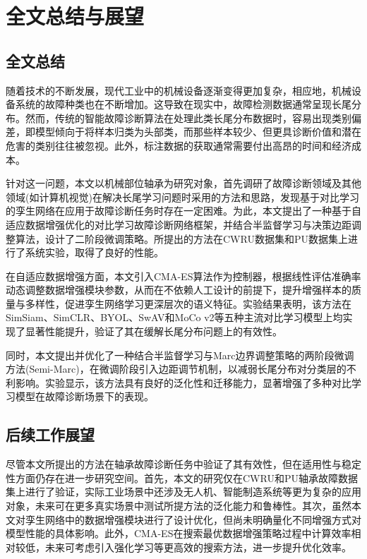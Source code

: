 \documentclass[master]{thesis-uestc}
\begin{document}
\chapter{全文总结与展望}

\section{全文总结}
随着技术的不断发展，现代工业中的机械设备逐渐变得更加复杂，相应地，机械设备系统的故障种类也在不断增加。这导致在现实中，故障检测数据通常呈现长尾分布。然而，传统的智能故障诊断算法在处理此类长尾分布数据时，容易出现类别偏差，即模型倾向于将样本归类为头部类，而那些样本较少、但更具诊断价值和潜在危害的类别往往被忽视。此外，标注数据的获取通常需要付出高昂的时间和经济成本。

针对这一问题，本文以机械部位轴承为研究对象，首先调研了故障诊断领域及其他领域(如计算机视觉)在解决长尾学习问题时采用的方法和思路，发现基于对比学习的孪生网络在应用于故障诊断任务时存在一定困难。为此，本文提出了一种基于自适应数据增强优化的对比学习故障诊断网络框架，并结合半监督学习与决策边距调整算法，设计了二阶段微调策略。所提出的方法在CWRU数据集和PU数据集上进行了系统实验，取得了良好的性能。

在自适应数据增强方面，本文引入CMA-ES算法作为控制器，根据线性评估准确率动态调整数据增强模块参数，从而在不依赖人工设计的前提下，提升增强样本的质量与多样性，促进孪生网络学习更深层次的语义特征。实验结果表明，该方法在SimSiam、SimCLR、BYOL、SwAV和MoCo v2等五种主流对比学习模型上均实现了显著性能提升，验证了其在缓解长尾分布问题上的有效性。

同时，本文提出并优化了一种结合半监督学习与Marc边界调整策略的两阶段微调方法(Semi-Marc)，在微调阶段引入边距调节机制，以减弱长尾分布对分类层的不利影响。实验显示，该方法具有良好的泛化性和迁移能力，显著增强了多种对比学习模型在故障诊断场景下的表现。

\section{后续工作展望}
尽管本文所提出的方法在轴承故障诊断任务中验证了其有效性，但在适用性与稳定性方面仍存在进一步研究空间。首先，本文的研究仅在CWRU和PU轴承故障数据集上进行了验证，实际工业场景中还涉及无人机、智能制造系统等更为复杂的应用对象，未来可在更多真实场景中测试所提方法的泛化能力和鲁棒性。其次，虽然本文对孪生网络中的数据增强模块进行了设计优化，但尚未明确量化不同增强方式对模型性能的具体影响。此外，CMA-ES在搜索最优数据增强策略过程中计算效率相对较低，未来可考虑引入强化学习等更高效的搜索方法，进一步提升优化效率。
\end{document}

